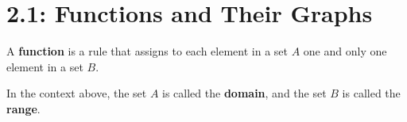 \documentclass[../mathNotesPreamble]{subfiles}
\providecommand{\relscalefact}{1.4}
\begin{document}
\relscale{\relscalefact}
  \section{2.1: Functions and Their Graphs}
  \begin{defn*}
    A \textbf{function} is a rule that assigns to each element in a set $A$ one and only one element in a set $B$.

    In the context above, the set $A$ is called the \textbf{domain}, and the set $B$ is called the \textbf{range}.
  \end{defn*}

  \noindent
  \begin{minipage}{0.495\linewidth}
    \newcommand{\funcMachine}{--++(0,-vert) --++(dx,-dy) |- ++(-a,-vert) |- ++(c,-h)
      -- ++(0,-vert) --++(-dx, -dy)[sharp corners] --++(0,-vert-vgap) %
      --++(b+2*dx,0)[rounded corners] --++(0,vert+vgap) --++(-dx,dy) |- ++(a,vert)
      -- ++(0,h) -| ++(-c,vert) --++(dx,dy) --++(0,vert); %
    }
    \centering
  \end{minipage}\hfill%
\end{document}
